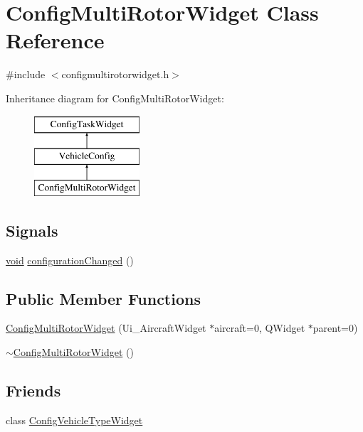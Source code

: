 \hypertarget{class_config_multi_rotor_widget}{\section{\-Config\-Multi\-Rotor\-Widget \-Class \-Reference}
\label{class_config_multi_rotor_widget}
}


{\ttfamily \#include $<$configmultirotorwidget.\-h$>$}

\-Inheritance diagram for \-Config\-Multi\-Rotor\-Widget\-:\begin{figure}[H]
\begin{center}
\leavevmode
\includegraphics[height=3.000000cm]{class_config_multi_rotor_widget}
\end{center}
\end{figure}
\subsection*{\-Signals}
\begin{DoxyCompactItemize}
\item 
\hyperlink{group___u_a_v_objects_plugin_ga444cf2ff3f0ecbe028adce838d373f5c}{void} \hyperlink{group___config_plugin_ga716e8f2fab4b0afb5b3c2df16b199259}{configuration\-Changed} ()
\end{DoxyCompactItemize}
\subsection*{\-Public \-Member \-Functions}
\begin{DoxyCompactItemize}
\item 
\hyperlink{group___config_plugin_ga1f8b823890ddd40ac391df9aa59cfd79}{\-Config\-Multi\-Rotor\-Widget} (\-Ui\-\_\-\-Aircraft\-Widget $\ast$aircraft=0, \-Q\-Widget $\ast$parent=0)
\item 
\hyperlink{group___config_plugin_gac8ee6c628cb4f8f195395978f8f086bb}{$\sim$\-Config\-Multi\-Rotor\-Widget} ()
\end{DoxyCompactItemize}
\subsection*{\-Friends}
\begin{DoxyCompactItemize}
\item 
class \hyperlink{group___config_plugin_gaf1f904d5df6619518f3228b2d5d238d0}{\-Config\-Vehicle\-Type\-Widget}
\end{DoxyCompactItemize}


